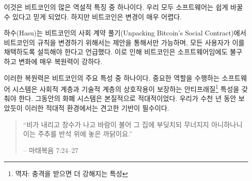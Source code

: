 \begin{comment}
	This is one of the many paradoxical properties of Bitcoin. We all came
	to believe that anything which is software can be changed easily. But
	the nature of the beast makes changing it bloody hard.
\end{comment}
이것은 비트코인의 많은 역설적 특징 중 하나이다.
우리 모두 소프트웨어는 쉽게 바꿀 수 있다고 믿게 되었다.
하지만 비트코인은 변경이 매우 어렵다. 
	
\begin{comment}
	As Hasu beautifully shows in Unpacking Bitcoin's Social
	Contract~\cite{social-contract}, changing the rules of Bitcoin is only possible
	by \textit{proposing} a change, and consequently \textit{convincing} all users
	of Bitcoin to adopt this change. This makes Bitcoin very resilient to change,
	even though it is software.
\end{comment}
하수(Hasu)는 비트코인의 사회 계약 풀기(Unpacking Bitcoin's Social Contract)\cite{social-contract}에서
비트코인의 규칙을 변경하기 위해서는 제안을 통해서만 가능하며, 모든 사용자가 이를 채택하도록 설득해야 한다고 언급했다.
이로 인해 비트코인은 소프트웨어임에도 불구하고 변화에 매우 복원력이 강하다.

\begin{comment}
	This resilience is one of the most important properties of Bitcoin.
	Critical software systems have to be antifragile, which is what the
	interplay of Bitcoin's social layer and its technical layer guarantees.
	Monetary systems are adversarial by nature, and as we have known for
	thousands of years solid foundations are essential in an adversarial
	environment.
\end{comment}
이러한 복원력은 비트코인의 주요 특성 중 하나이다.
중요한 역할을 수행하는 소프트웨어 시스템은 사회적 계층과 기술적 계층의 상호작용이 보장하는 
안티프래질\footnote{역자: 충격을 받으면 더 강해지는 특성} 특성을 갖춰야 한다.
그동안의 화폐 시스템은 본질적으로 적대적이었다.
우리가 수천 년 동안 보았듯이 이러한 적대적 환경에서는 견고한 기반이 필수이다.
	
\begin{quotation}\begin{samepage}
	\begin{comment}
		\enquote{The rain came down, the floods came, and the winds blew, and beat on
			that house; and it didn't fall, for it was founded on the rock.}
		\begin{flushright} -- Matthew 7:24--27
		\end{comment}
		\enquote{비가 내리고 창수가 나고 바람이 불어 그 집에 부딪치되 무너지지 아니하나니 이는 주추를 반석 위에 놓은 까닭이요.}
		\begin{flushright} -- 마태복음 7:24--27
\end{flushright}\end{samepage}\end{quotation}
		
